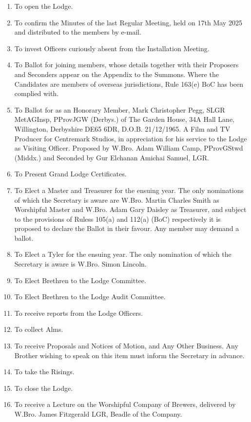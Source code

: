 \begin{enumerate}
  \item To open the Lodge.
  \item To confirm the Minutes of the last Regular Meeting, held on 17th May 2025 and distributed to the members by e-mail.
  \item To invest Officers curiously absent from the Installation Meeting.
  \item To Ballot for joining members, whose details together with their Proposers and Seconders appear on the Appendix to the Summons. Where the Candidates are members of overseas jurisdictions, Rule 163(e) BoC has been complied with.
  \item To Ballot for as an Honorary Member, Mark Christopher Pegg, SLGR MetAGInsp, PProvJGW (Derbys.) of The Garden House, 34A Hall Lane, Willington, Derbyshire DE65 6DR, D.O.B. 21/12/1965. A Film and TV Producer for Centremark Studios, in appreciation for his service to the Lodge as Visiting Officer. Proposed by W.Bro. Adam William Camp, PProvGStwd (Middx.) and Seconded by Gur Elchanan Amichai Samuel, LGR.
  \item To Present Grand Lodge Certificates.
  \item To Elect a Master and Treasurer for the ensuing year. The only nominations of which the Secretary is aware are W.Bro. Martin Charles Smith as Worshipful Master and W.Bro. Adam Gary Daisley as Treasurer, and subject to the provisions of  Ruless 105(a) and 112(a) (BoC) respectively it is proposed to declare the Ballot in their favour. Any member may demand a ballot.
  \item To Elect a Tyler for the ensuing year. The only nomination of which the Secretary is aware is W.Bro. Simon Lincoln.
  \item To Elect Brethren to the Lodge Committee.
  \item To Elect Brethren to the Lodge Audit Committee.
  \item To receive reports from the Lodge Officers.
  \item To collect Alms.
  \item To receive Proposals and Notices of Motion, and Any Other Business. Any Brother wishing to speak on this item must inform the Secretary in advance.
  \item To take the Risings.
  \item To close the Lodge.
  \item To receive a Lecture on the Worshipful Company of Brewers, delivered by W.Bro. James Fitzgerald LGR, Beadle of the Company.
\end{enumerate}